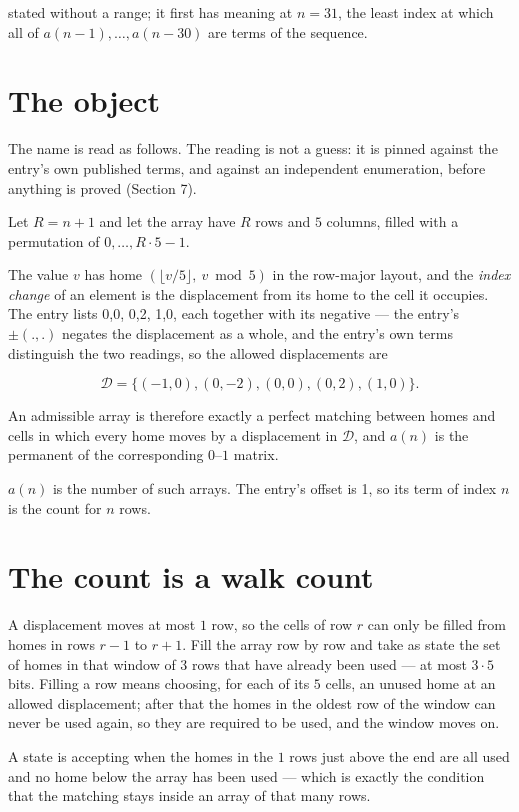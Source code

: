 \documentclass[11pt]{article}
\theoremstyle{definition}
\begin{document}
stated without a range; it first has meaning at $n = 31$, the least index at which all of $a(n-1),\dots,a(n-30)$ are terms of the sequence.

\section{The object}

The name is read as follows. The reading is not a guess: it is pinned against the entry's own published terms, and against an independent enumeration, before anything is proved (Section 7).

Let $R = n + 1$ and let the array have $R$ rows and $5$ columns, filled with a permutation of $0,\dots,R\cdot5-1$.

The value $v$ has home $(\lfloor v/5\rfloor,\ v \bmod 5)$ in the row-major layout, and the {\itshape index change} of an element is the displacement from its home to the cell it occupies. The entry lists 0,0, 0,2, 1,0, each together with its negative --- the entry's $\pm(.,.)$ negates the displacement as a whole, and the entry's own terms distinguish the two readings, so the allowed displacements are

\[\mathcal{D} = \{(-1,0), (0,-2), (0,0), (0,2), (1,0)\}.\]

An admissible array is therefore exactly a perfect matching between homes and cells in which every home moves by a displacement in $\mathcal{D}$, and $a(n)$ is the permanent of the corresponding $0$--$1$ matrix.

$a(n)$ is the number of such arrays. The entry's offset is 1, so its term of index $n$ is the count for $n$ rows.

\section{The count is a walk count}

A displacement moves at most $1$ row, so the cells of row $r$ can only be filled from homes in rows $r-1$ to $r+1$. Fill the array row by row and take as state the set of homes in that window of $3$ rows that have already been used --- at most $3\cdot5$ bits. Filling a row means choosing, for each of its $5$ cells, an unused home at an allowed displacement; after that the homes in the oldest row of the window can never be used again, so they are required to be used, and the window moves on.

A state is accepting when the homes in the $1$ rows just above the end are all used and no home below the array has been used --- which is exactly the condition that the matching stays inside an array of that many rows.
\end{document}
